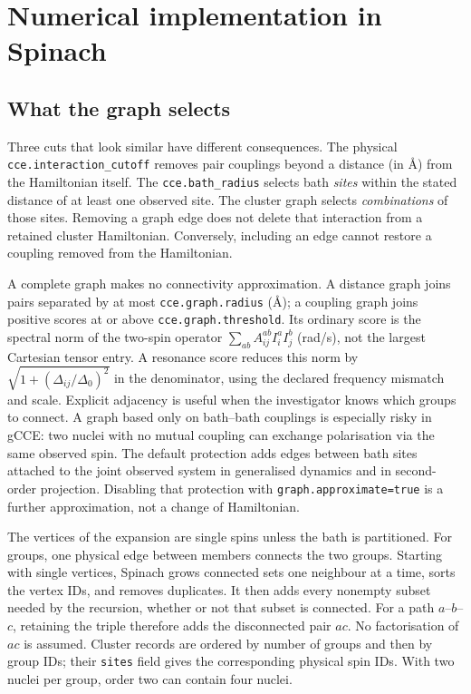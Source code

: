 \documentclass[11pt,a4paper]{article}
\newcommand{\code}[1]{\texttt{#1}}
\begin{document}
\section{Numerical implementation in Spinach}
\label{sec:numerics}

\subsection{What the graph selects}

Three cuts that look similar have different consequences. The physical
\code{cce.interaction\_cutoff} removes pair couplings beyond a distance
(in \AA) from the Hamiltonian itself. The \code{cce.bath\_radius}
selects bath \emph{sites} within the stated distance of at least one
observed site. The cluster graph selects \emph{combinations} of those
sites. Removing a graph edge does not delete that interaction from a
retained cluster Hamiltonian. Conversely, including an edge cannot
restore a coupling removed from the Hamiltonian.

A complete graph makes no connectivity approximation. A distance graph
joins pairs separated by at most \code{cce.graph.radius} (\AA); a
coupling graph joins positive scores at or above
\code{cce.graph.threshold}. Its ordinary score is the spectral norm of
the two-spin operator $\sum_{ab}A_{ij}^{ab} I_i^a I_j^b$ (rad/s), not
the largest Cartesian tensor entry. A resonance score reduces this norm
by $\sqrt{1+(\Delta_{ij}/\Delta_0)^2}$ in the denominator, using the
declared frequency mismatch and scale. Explicit adjacency is useful when
the investigator knows which groups to connect. A graph based only on
bath--bath couplings is especially risky in gCCE: two nuclei with no
mutual coupling can exchange polarisation via the same observed spin.
The default protection adds edges between bath sites attached to the
joint observed system in generalised dynamics and in second-order
projection. Disabling that protection with \code{graph.approximate=true}
is a further approximation, not a change of Hamiltonian.

The vertices of the expansion are single spins unless the bath is
partitioned. For groups, one physical edge between members connects the
two groups. Starting with single vertices, Spinach grows connected sets
one neighbour at a time, sorts the vertex IDs, and removes duplicates.
It then adds every nonempty subset needed by the recursion, whether or
not that subset is connected. For a path $a$--$b$--$c$, retaining the
triple therefore adds the disconnected pair $ac$. No factorisation of
$ac$ is assumed. Cluster records are ordered by number of groups and then
by group IDs; their \code{sites} field gives the corresponding physical
spin IDs. With two nuclei per group, order two can contain four nuclei.
\end{document}
